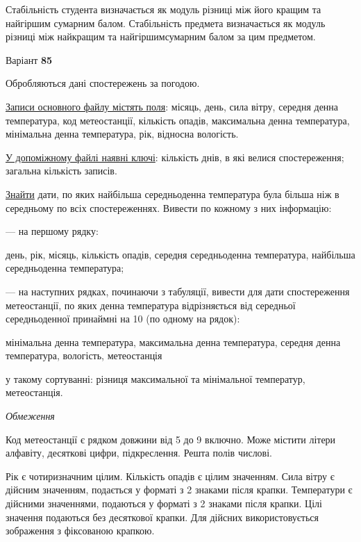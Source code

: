 \documentclass[11pt, ukrainian]{article}
\begin{document}
Стабільність студента визначається як модуль різниці між його кращим та найгіршим сумарним балом.
Стабільність предмета визначається як модуль різниці між найкращим та найгіршимсумарним балом за цим предметом.






\par
\newpage
{\center Варіант  \No \textbf { 85 }\par}
\bigskip
Обробляються дані спостережень за погодою. 

\underline{Записи основного файлу містять поля}: місяць, день, сила вітру, середня денна температура, код метеостанції, кількість опадів, максимальна денна температура, мінімальна денна температура, рік, відносна вологість.

\underline{У допоміжному файлі наявні ключі}: кількість днів, в які велися спостереження; загальна кількість записів.

\underline{Знайти} дати, по яких найбільша середньоденна температура була більша ніж в середньому по всіх спостереженнях. Вивести по кожному з них інформацію:\par
{\noindent}--- на першому рядку:\par
день, рік, місяць, кількість опадів, середня середньоденна температура, найбільша середньоденна температура;

{\noindent}--- на наступних рядках, починаючи з табуляції, вивести для дати спостереження метеостанції, по яких денна температура відрізняється від середньої середньоденної принаймні на 10 (по одному на рядок):\par
мінімальна денна температура, максимальна денна температура, середня денна температура, вологість, метеостанція

{\noindent}у такому сортуванні: різниця максимальної та мінімальної температур, метеостанція.


\bigskip\textit{Обмеження}

Код метеостанції є рядком довжини від 5 до 9 включно.
Може містити літери алфавіту, десяткові цифри, підкреслення. Решта полів числові.

Рік є чотиризначним цілим.
Кількість опадів є цілим значенням.
Сила вітру є дійсним значенням, подається у форматі з 2 знаками після крапки.
Температури є дійсними значеннями, подаються у форматі з 2 знаками після крапки.
Цілі значення подаються без десяткової крапки.
Для дійсних використовується зображення з фіксованою крапкою.
\end{document}
